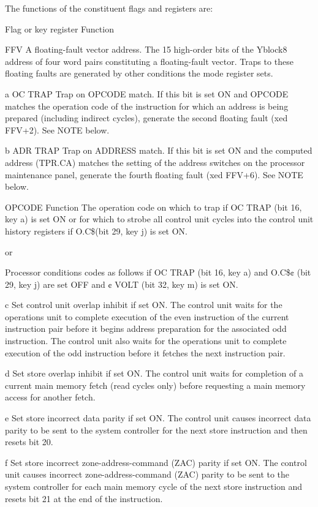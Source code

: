The functions of the constituent flags and registers are:

Flag or key register Function

FFV A floating-fault vector address. The 15 high-order bits of the Yblock8 address of four word pairs constituting a floating-fault vector.  Traps to these floating faults are generated by other conditions the mode register sets.

a OC TRAP Trap on OPCODE match. If this bit is set ON and OPCODE matches the operation code of the instruction for which an address is being prepared (including indirect cycles), generate the second floating fault (xed FFV+2). See NOTE below.

b ADR TRAP Trap on ADDRESS match. If this bit is set ON and the computed
address (TPR.CA) matches the setting of the address switches on the processor
maintenance panel, generate the fourth floating fault (xed FFV+6). See NOTE
below.

OPCODE Function The operation code on which to trap if OC TRAP (bit 16, key a)
is set ON or for which to strobe all control unit cycles into the control unit
history registers if O.C\$\textcent (bit 29, key j) is set ON.

or

Processor conditions codes as follows if OC TRAP (bit 16, key a) and O.C\$¢
(bit 29, key j) are set OFF and ¢ VOLT (bit 32, key m) is set ON.

c Set control unit overlap inhibit if set ON. The control unit waits for the
operations unit to complete execution of the even instruction of the current
instruction pair before it begins address preparation for the associated odd
instruction. The control unit also waits for the operations unit to complete
execution of the odd instruction before it fetches the next instruction pair.

d Set store overlap inhibit if set ON. The control unit waits for completion of
a current main memory fetch (read cycles only) before requesting a main memory
access for another fetch.

e Set store incorrect data parity if set ON. The control unit causes incorrect
data parity to be sent to the system controller for the next store instruction
and then resets bit 20.

f Set store incorrect zone-address-command (ZAC) parity if set ON. The control
unit causes incorrect zone-address-command (ZAC) parity to be sent to the
system controller for each main memory cycle of the next store instruction and
resets bit 21 at the end of the instruction.

